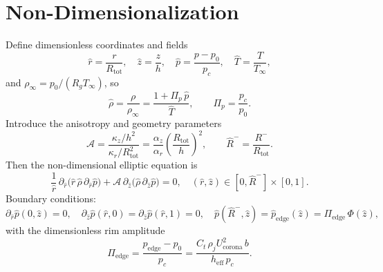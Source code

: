 \documentclass[11pt,a4paper]{article}
\begin{document}
\section{Non-Dimensionalization}
Define dimensionless coordinates and fields
\begin{equation}
  \hat r=\frac{r}{R_{\text{tot}}},\quad
  \hat z=\frac{z}{h},\quad
  \hat p=\frac{p-p_0}{p_c},\quad
  \hat T=\frac{T}{T_\infty},
  \label{eq:nondim_vars}
\end{equation}
and $\rho_\infty=p_0/(R_g T_\infty)$, so
\begin{equation}
  \hat\rho=\frac{\rho}{\rho_\infty}=\frac{1+\Pi_p\,\hat p}{\hat T},\qquad
  \Pi_p=\frac{p_c}{p_0}.
  \label{eq:rho_hat}
\end{equation}
Introduce the anisotropy and geometry parameters
\begin{equation}
  \mathcal{A}=\frac{\kappa_z/h^2}{\kappa_r/R_{\text{tot}}^2}
  =\frac{\alpha_z}{\alpha_r}\left(\frac{R_{\text{tot}}}{h}\right)^2,\qquad
  \hat R^-=\frac{R^-}{R_{\text{tot}}}.
  \label{eq:A_param}
\end{equation}
Then the non-dimensional elliptic equation is
\begin{equation}
  \boxed{\
  \frac{1}{\hat r}\,\partial_{\hat r}\!\Big(\hat r\,\hat\rho\,\partial_{\hat r}\hat p\Big)
  + \mathcal{A}\,\partial_{\hat z}\!\Big(\hat\rho\,\partial_{\hat z}\hat p\Big)=0,\quad
  (\hat r,\hat z)\in[0,\hat R^-]\times[0,1].\ }
  \label{eq:elliptic_hat}
\end{equation}
Boundary conditions:
\begin{equation}
  \partial_{\hat r}\hat p(0,\hat z)=0,\quad
  \partial_{\hat z}\hat p(\hat r,0)=\partial_{\hat z}\hat p(\hat r,1)=0,\quad
  \hat p(\hat R^-,\hat z)=\hat p_\mathrm{edge}(\hat z)=\Pi_\mathrm{edge}\,\Phi(\hat z),
  \label{eq:BC_hat}
\end{equation}
with the dimensionless rim amplitude
\begin{equation}
  \Pi_\mathrm{edge}=\frac{p_\mathrm{edge}-p_0}{p_c}
  =\frac{C_t\,\rho_j U_\mathrm{corona}^2\,b}{h_\mathrm{eff}\,p_c}.
  \label{eq:Pi_edge}
\end{equation}
\end{document}

